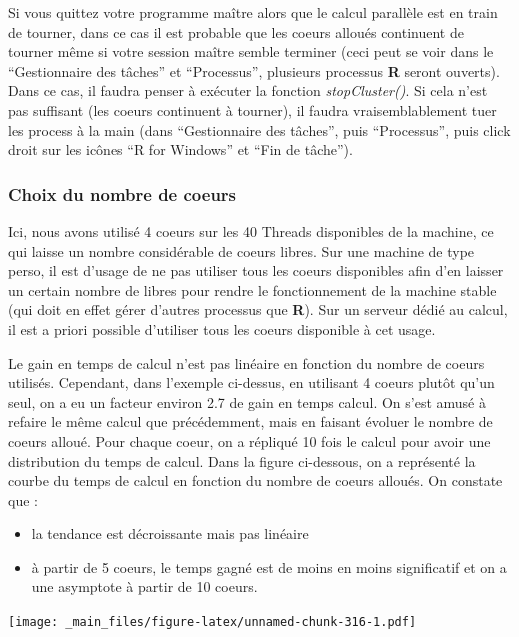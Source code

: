 \documentclass[
]{book}
\providecommand{\tightlist}{%
  \setlength{\itemsep}{0pt}\setlength{\parskip}{0pt}}
\theoremstyle{definition}
\theoremstyle{definition}
\theoremstyle{definition}
\theoremstyle{definition}
\theoremstyle{remark}
\begin{document}
Si vous quittez votre programme maître alors que le calcul parallèle est en train de tourner, dans ce cas il est probable que les coeurs alloués continuent de tourner même si votre session maître semble terminer (ceci peut se voir dans le ``Gestionnaire des tâches'' et ``Processus'', plusieurs processus \textbf{R} seront ouverts). Dans ce cas, il faudra penser à exécuter la fonction \emph{stopCluster()}. Si cela n'est pas suffisant (les coeurs continuent à tourner), il faudra vraisemblablement tuer les process à la main (dans ``Gestionnaire des tâches'', puis ``Processus'', puis click droit sur les icônes ``R for Windows'' et ``Fin de tâche'').

\hypertarget{choix-du-nombre-de-coeurs}{%
\subsubsection{Choix du nombre de coeurs}\label{choix-du-nombre-de-coeurs}}

Ici, nous avons utilisé 4 coeurs sur les 40 Threads disponibles de la machine, ce qui laisse un nombre considérable de coeurs libres. Sur une machine de type perso, il est d'usage de ne pas utiliser tous les coeurs disponibles afin d'en laisser un certain nombre de libres pour rendre le fonctionnement de la machine stable (qui doit en effet gérer d'autres processus que \textbf{R}). Sur un serveur dédié au calcul, il est a priori possible d'utiliser tous les coeurs disponible à cet usage.

Le gain en temps de calcul n'est pas linéaire en fonction du nombre de coeurs utilisés. Cependant, dans l'exemple ci-dessus, en utilisant 4 coeurs plutôt qu'un seul, on a eu un facteur environ 2.7 de gain en temps calcul. On s'est amusé à refaire le même calcul que précédemment, mais en faisant évoluer le nombre de coeurs alloué. Pour chaque coeur, on a répliqué 10 fois le calcul pour avoir une distribution du temps de calcul. Dans la figure ci-dessous, on a représenté la courbe du temps de calcul en fonction du nombre de coeurs alloués. On constate que :

\begin{itemize}
\tightlist
\item
  la tendance est décroissante mais pas linéaire
\item
  à partir de 5 coeurs, le temps gagné est de moins en moins significatif et on a une asymptote à partir de 10 coeurs.
\end{itemize}

\texttt{[image: \_main\_files/figure-latex/unnamed-chunk-316-1.pdf]}
\end{document}
